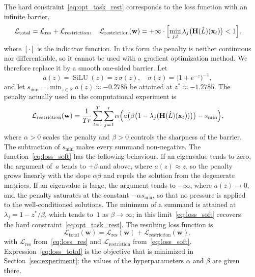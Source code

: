 \documentclass[sn-mathphys-num]{sn-jnl}
\theoremstyle{thmstylethree}
\theoremstyle{thmstyletwo}
\theoremstyle{thmstyleone}
\begin{document}
The hard constraint~\eqref{eq:opt_task_rest} corresponds to the loss function with an infinite barrier,
\begin{equation}
\label{eq:loss_hard}
    \mathcal{L}_{\text{total}} = \mathcal{L}_{\text{res}} + \mathcal{L}_\text{restriction},
    \quad
    \mathcal{L}_\text{restriction}(\mathbf{w}) = +\infty \cdot \Bigl[\min_{j,t} \lambda_j\bigl(\mathbf{H}(\hat{L})(\mathbf{x}_t)\bigr) < 1 \Bigr],
\end{equation}
where $[\cdot]$ is the indicator function. In this form the penalty is neither continuous nor differentiable, so it cannot be used with a gradient optimization method. We therefore replace it by a smooth one-sided barrier. Let
\[
a(z) = \operatorname{SiLU}(z) = z\,\sigma(z), \quad \sigma(z) = \bigl(1 + e^{-z}\bigr)^{-1},
\]
and let $s_{\min} = \min_{z \in \mathbb{R}} a(z) \approx -0.2785$ be attained at $z^{*} \approx -1.2785$. The penalty actually used in the computational experiment is
\begin{equation}
\label{eq:loss_soft}
    \mathcal{L}_\text{restriction}(\mathbf{w}) = \frac{1}{Tr}\sum_{t=1}^{T} \sum_{j=1}^{r} \alpha \Bigl( a\bigl(\beta\bigl(1 - \lambda_j(\mathbf{H}(\hat{L})(\mathbf{x}_t))\bigr)\bigr) - s_{\min} \Bigr),
\end{equation}
where $\alpha > 0$ scales the penalty and $\beta > 0$ controls the sharpness of the barrier. The subtraction of $s_{\min}$ makes every summand non-negative. The function~\eqref{eq:loss_soft} has the following behaviour. If an eigenvalue tends to zero, the argument of~$a$ tends to $+\beta$ and above, where $a(z) \approx z$, so the penalty grows linearly with the slope $\alpha\beta$ and repels the solution from the degenerate matrices. If an eigenvalue is large, the argument tends to $-\infty$, where $a(z) \to 0$, and the penalty saturates at the constant $-\alpha s_{\min}$, so that no pressure is applied to the well-conditioned solutions. The minimum of a summand is attained at $\lambda_j = 1 - z^{*}/\beta$, which tends to~$1$ as $\beta \to \infty$; in this limit~\eqref{eq:loss_soft} recovers the hard constraint~\eqref{eq:opt_task_rest}. The resulting loss function is
\begin{equation}
\label{eq:loss_total}
    \mathcal{L}_{\text{total}}(\mathbf{w}) = \mathcal{L}_{\text{res}}(\mathbf{w}) + \mathcal{L}_\text{restriction}(\mathbf{w}),
\end{equation}
with $\mathcal{L}_{\text{res}}$ from~\eqref{eq:loss_res} and $\mathcal{L}_\text{restriction}$ from~\eqref{eq:loss_soft}. Expression~\eqref{eq:loss_total} is the objective that is minimized in Section~\ref{sec:experiment}; the values of the hyperparameters $\alpha$ and $\beta$ are given there.
\end{document}
